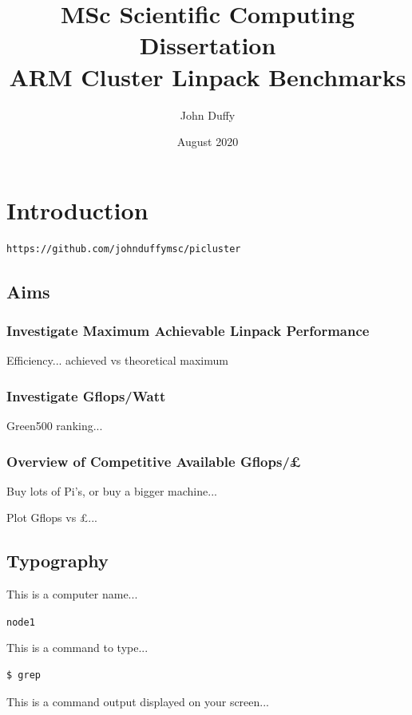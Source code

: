 \documentclass{article}
\title{MSc Scientific Computing Dissertation\\ARM Cluster Linpack Benchmarks}
\author{John Duffy}
\date{August 2020}
\begin{document}
\maketitle



\section{Introduction}

\begin{verbatim}
https://github.com/johnduffymsc/picluster
\end{verbatim}


\subsection{Aims}

\subsubsection{Investigate Maximum Achievable Linpack Performance}

Efficiency... achieved vs theoretical maximum


\subsubsection{Investigate Gflops/Watt}

Green500 ranking...


\subsubsection{Overview of Competitive Available Gflops/£}

Buy lots of Pi's, or buy a bigger machine...

Plot Gflops vs £...


\subsection{Typography}

This is a computer name...

\verb|node1|

This is a command to type...

\lstset{style=termstyle}
\begin{lstlisting}[]
$ grep
\end{lstlisting}

This is a command output displayed on your screen...
\end{document}
